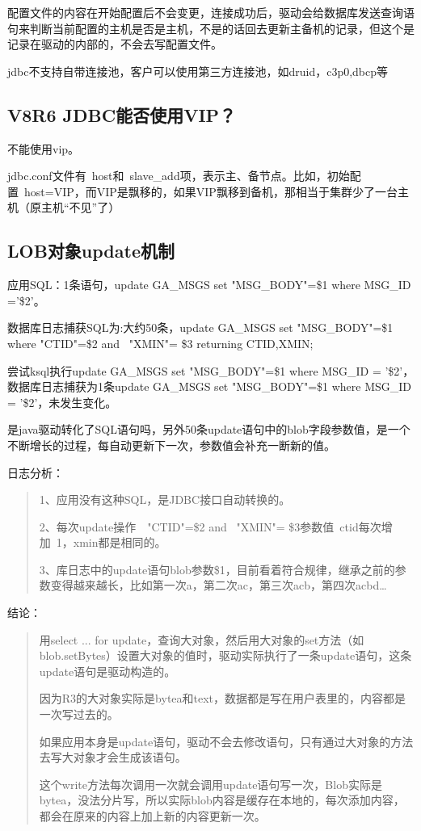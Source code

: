 \documentclass[letterpaper,10pt,english]{sphinxmanual}
\let\sphinxpxdimen\pdfpxdimen\else\newdimen\sphinxpxdimen
\begin{document}
配置文件的内容在开始配置后不会变更，连接成功后，驱动会给数据库发送查询语句来判断当前配置的主机是否是主机，不是的话回去更新主备机的记录，但这个是记录在驱动的内部的，不会去写配置文件。

jdbc不支持自带连接池，客户可以使用第三方连接池，如druid，c3p0,dbcp等


\subsection{V8R6 JDBC能否使用VIP？}
\label{\detokenize{interface/jdbc:v8r6-jdbcvip}}
不能使用vip。

jdbc.conf文件有 host和 slave\_add项，表示主、备节点。比如，初始配置 host=VIP，而VIP是飘移的，如果VIP飘移到备机，那相当于集群少了一台主机（原主机“不见”了）


\subsection{LOB对象update机制}
\label{\detokenize{interface/jdbc:lobupdate}}
应用SQL：1条语句，update GA\_MSGS set "MSG\_BODY"=\$1 where MSG\_ID ='\$2'。

数据库日志捕获SQL为:大约50条，update GA\_MSGS set "MSG\_BODY"=\$1 where "CTID"=\$2 and  "XMIN"= \$3 returning CTID,XMIN;

尝试ksql执行update GA\_MSGS set "MSG\_BODY"=\$1 where MSG\_ID = '\$2'，数据库日志捕获为1条update GA\_MSGS set "MSG\_BODY"=\$1 where MSG\_ID = '\$2'，未发生变化。

是java驱动转化了SQL语句吗，另外50条update语句中的blob字段参数值，是一个不断增长的过程，每自动更新下一次，参数值会补充一断新的值。

日志分析：
\begin{quote}

1、应用没有这种SQL，是JDBC接口自动转换的。

2、每次update操作  "CTID"=\$2 and  "XMIN"= \$3参数值 ctid每次增加 1，xmin都是相同的。

3、库日志中的update语句blob参数\$1，目前看着符合规律，继承之前的参数变得越来越长，比如第一次a，第二次ac，第三次acb，第四次acbd…
\end{quote}

结论：
\begin{quote}

用select ... for update，查询大对象，然后用大对象的set方法（如blob.setBytes）设置大对象的值时，驱动实际执行了一条update语句，这条update语句是驱动构造的。

因为R3的大对象实际是bytea和text，数据都是写在用户表里的，内容都是一次写过去的。

如果应用本身是update语句，驱动不会去修改语句，只有通过大对象的方法去写大对象才会生成该语句。

这个write方法每次调用一次就会调用update语句写一次，Blob实际是bytea，没法分片写，所以实际blob内容是缓存在本地的，每次添加内容，都会在原来的内容上加上新的内容更新一次。

\begin{figure}[htbp]
\centering

\noindent\sphinxincludegraphics[width=554\sphinxpxdimen,height=416\sphinxpxdimen]{{jdbc-33958}.png}
\end{figure}
\end{quote}
\end{document}
